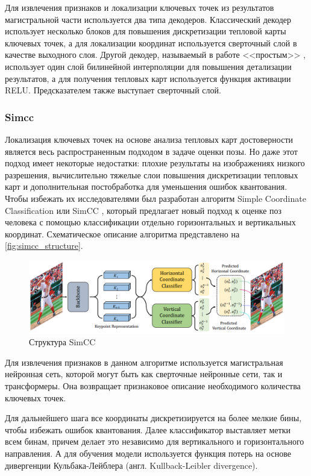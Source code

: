 Для извлечения признаков и локализации ключевых точек из результатов магистральной части используется два типа декодеров. Классический декодер использует несколько блоков для повышения дискретизации тепловой карты ключевых точек, а для локализации координат используется сверточный слой в качестве выходного слоя. Другой декодер, называемый в работе <<простым>> \cite{vitpose}, использует один слой билинейной интерполяции для повышения детализации результатов, а для получения тепловых карт используется функция активации RELU. Предсказателем также выступает сверточный слой.


\subsubsection*{Simcc}
\label{subsec:simcc}

Локализация ключевых точек на основе анализа тепловых карт достоверности является весь распространенным подходом в задаче оценки позы. Но даже этот подход имеет некоторые недостатки: плохие результаты на изображениях низкого разрешения, вычислительно тяжелые слои повышения дискретизации тепловых карт и дополнительная постобработка для уменьшения ошибок квантования. Чтобы избежать их исследователями был разработан алгоритм Simple Coordinate Classification или SimCC \cite{simcc}, который предлагает новый подход к оценке поз человека с помощью классификации отдельно горизонтальных и вертикальных координат. Схематическое описание алгоритма представлено на \autoref{fig:simcc_structure}.

\begin{figure}[h]
	\centering
	\includegraphics[width=\textwidth]{./images/simcc_structure}
	\caption{Структура SimCC \cite{simcc}}
	\label{fig:simcc_structure}
\end{figure}

Для извлечения признаков в данном алгоритме используется магистральная нейронная сеть, которой могут быть как сверточные нейронные сети, так и трансформеры. Она возвращает признаковое описание необходимого количества ключевых точек.

Для дальнейшего шага все координаты дискретизируется на более мелкие бины, чтобы избежать ошибок квантования. Далее классификатор выставляет метки всем бинам, причем делает это независимо для вертикального и горизонтального направления. А для обучения модели используется функция потерь на основе дивергенции Кульбака-Лейблера (англ. Kullback-Leibler divergence).

